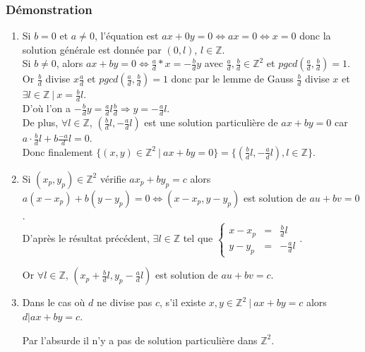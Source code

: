 \documentclass[a4paper,10pt]{book} %
\newcommand{\Z}{\mathbb{Z}}
\newcommand{\tq}{~|~}
\begin{document}
\subsubsection{Démonstration}
\begin{enumerate}
\item Si $b=0$ et $a\neq 0$, l'équation est $ax+0y=0\Leftrightarrow ax=0 \Leftrightarrow x=0$
donc la solution générale est donnée par $(0,l)$, $l\in \Z$.\\

Si $b\neq 0$, alors $ax+by=0 \Leftrightarrow \frac{a}{d}*x=-\frac{b}{d}y$ avec $\frac{a}{d},\frac{b}{d}\in \Z^2$ et $pgcd(\frac{a}{d},\frac{b}{d})=1$.\\
Or $\frac{b}{d}$ divise $x\frac{a}{d}$ et $pgcd(\frac{a}{d},\frac{b}{d})=1$ donc par le lemme de Gauss $\frac{b}{d}$ divise $x$ et $\exists l\in \Z \tq x=\frac{b}{d}l$.\\

D'où l'on a $-\frac{b}{d}y=\frac{a}{d}l\frac{b}{d}\Rightarrow y=-\frac{a}{d}l$.\\

De plus, $\forall l\in \Z$, $(\frac{b}{d}l,-\frac{a}{d}l)$ est une solution particulière de $ax+by=0$ car $a\cdot \frac{b}{d}l+b\frac{-a}{d}l=0$.\\

Donc finalement $\{(x,y)\in\Z^2\tq ax+by=0\}=\{(\frac{b}{d}l,-\frac{a}{d}l),l\in\Z\}$.\\

\item Si $(x_p,y_p)\in\Z^2$ vérifie $ax_p+by_p=c$ alors $a(x-x_p)+b(y-y_p)=0 \Leftrightarrow (x-x_p,y-y_p)$ est solution de $au+bv=0$.\\
D'après le résultat précédent, $\exists l\in\Z$ tel que $\left\{\begin{array}{rcl}
x-x_p&=&\frac{b}{d}l \\
y-y_p&=&-\frac{a}{d}l
\end{array}\right.$.

Or $\forall l\in \Z$, $(x_p+\frac{b}{d}l, y_p-\frac{a}{d}l)$ est solution de $au+bv=c$.\\

\item Dans le cas où $d$ ne divise pas $c$, s'il existe $x,y\in \Z^2 \tq ax+by=c$ alors $d|ax+by=c$.

Par l'absurde il n'y a pas de solution particulière dans $\Z^2$.
\end{enumerate}
\end{document}
